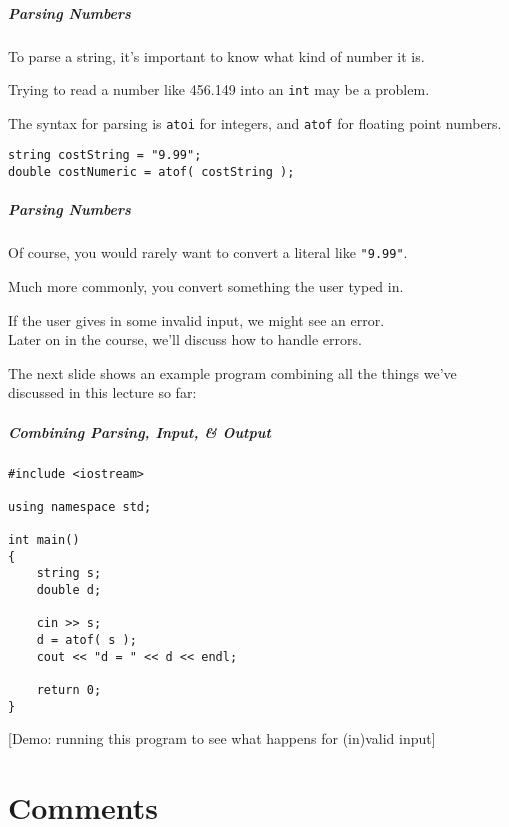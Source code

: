 \begin{frame}
\frametitle{Parsing Numbers}
To parse a string, it's important to know what kind of number it is.

Trying to read a number like 456.149 into an \texttt{int} may be a problem.

The syntax for parsing is \texttt{atoi} for integers, and \texttt{atof} for floating point numbers.

\texttt{string costString = "9.99";}\\
\texttt{double costNumeric = atof( costString );}

\end{frame}

\begin{frame}
\frametitle{Parsing Numbers}
Of course, you would rarely want to convert a literal like \texttt{"9.99"}.

Much more commonly, you convert something the user typed in.

If the user gives in some invalid input, we might see an error.\\
\quad Later on in the course, we'll discuss how to handle errors.

The next slide shows an example program combining all the things we've discussed in this lecture so far:

\end{frame}

\begin{frame}[fragile]
\frametitle{Combining Parsing, Input, \& Output}

\begin{verbatim}
#include <iostream>

using namespace std;

int main()
{
    string s;
    double d;

    cin >> s;
    d = atof( s );
    cout << "d = " << d << endl;

    return 0;
}
\end{verbatim}


[Demo: running this program to see what happens for (in)valid input]

\end{frame}


\part{Comments}
\begin{frame}\partpage\end{frame}

